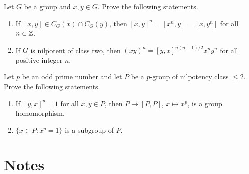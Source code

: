 
\begin{prob}
Let $G$ be a group and $x,y\in G$.  Prove the following statements.
\begin{enumerate}
	\item If $[x,y]\in C_G(x)\cap C_G(y)$, then
	$[x,y]^n=[x^n,y]=[x,y^n]$
	for all $n\in\mathbb{Z}$.
	\item If $G$ is nilpotent of class two, then $(xy)^n=[y,x]^{n(n-1)/2}x^ny^n$ 
	for all positive integer $n$.
\end{enumerate}	
\end{prob}

\begin{prob}
	Let $p$ be an odd prime number and  
	let $P$ be a $p$-group of nilpotency class $\leq2$. Prove the following statements.
	\begin{enumerate}
	\item 	If $[y,x]^p=1$ for all $x,y\in P$, then $P\to [P,P]$,
	$x\mapsto x^p$, is a group homomorphism. 
	\item $\{x\in P:x^p=1\}$ is a subgroup of $P$. 
	\end{enumerate}
\end{prob}





\section*{Notes}
